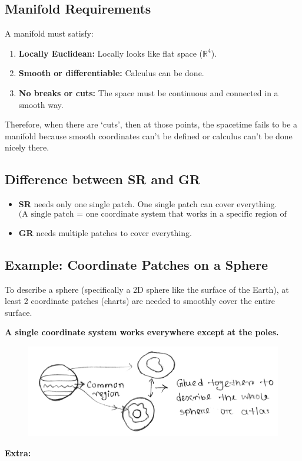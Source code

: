 \documentclass[14pt]{article} %
\begin{document}
\subsection*{Manifold Requirements}
A manifold must satisfy:

\begin{enumerate}
    \item \textbf{Locally Euclidean:} Locally looks like flat space ($\mathbb{R}^4$).
    \item \textbf{Smooth or differentiable:} Calculus can be done.
    \item \textbf{No breaks or cuts:} The space must be continuous and connected in a smooth way.
\end{enumerate}
\noindent
Therefore, when there are `cuts', then at those points, the spacetime fails to be a manifold because smooth coordinates can't be defined or calculus can't be done nicely there.

\subsection*{Difference between SR and GR}
\begin{itemize}
    \item \textbf{SR} needs only one single patch. One single patch can cover everything.
    $$ \text{(A single patch = one coordinate system that works in a specific region of spacetime)} $$
    \item \textbf{GR} needs multiple patches to cover everything.
\end{itemize}

\subsection*{Example: Coordinate Patches on a Sphere}

To describe a sphere (specifically a 2D sphere like the surface of the Earth), at least 2 coordinate patches (charts) are needed to smoothly cover the entire surface.
\begin{center}
    \textbf{A single coordinate system works everywhere except at the poles.}
\end{center}
\begin{figure}[H]
\centering
\includegraphics[width=0.8\linewidth]{L(-1)_3.jpg}
\caption*{}
\end{figure}
\vspace{-0.9cm}
\noindent
\textbf{Extra:} 
\end{document}
